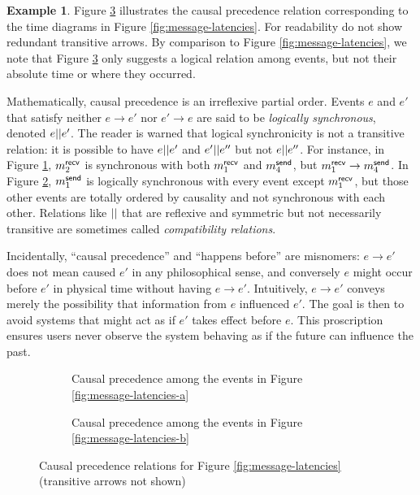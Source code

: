 \documentclass[]             %
{NASA}                       %
\theoremstyle{definition}
\newtheorem{example}{Example}[section]
\begin{document}
\begin{example}
  Figure \ref{fig:causal-precedence} illustrates the causal precedence
  relation corresponding to the time diagrams in Figure
  \ref{fig:message-latencies}. For readability do not show redundant
  transitive arrows. By comparison to Figure
  \ref{fig:message-latencies}, we note that Figure
  \ref{fig:causal-precedence} only suggests a logical relation among
  events, but not their absolute time or where they occurred.
\end{example}

Mathematically, causal precedence is an irreflexive partial
order. Events $e$ and $e'$ that satisfy neither $e \to e'$ nor
$e' \to e$ are said to be \emph{logically synchronous}, denoted
$e || e'$. The reader is warned that logical synchronicity is not
a transitive relation: it is possible to have $e || e'$ and
$e' || e''$ but not $e || e''$. For instance, in Figure
\ref{fig:message-co-a}, $m_{2}^{\mathsf{recv}}$ is synchronous with both
$m_{1}^{\mathsf{recv}}$ and $m_{4}^{\mathsf{send}}$, but $m_{1}^{\mathsf{recv}} \to m_{4}^{\mathsf{send}}$. In Figure
\ref{fig:message-co-b}, $m_{1}^{\mathsf{send}}$ is logically synchronous with
every event except $m_{1}^{\mathsf{recv}}$, but those other events are totally
ordered by causality and not synchronous with each other. Relations
like $||$ that are reflexive and symmetric but not necessarily
transitive are sometimes called \emph{compatibility relations}.

Incidentally, ``causal precedence'' and ``happens before'' are
misnomers: $e \to e'$ does not mean caused $e'$ in any philosophical
sense, and conversely $e$ might occur before $e'$ in physical time
without having $e \to e'$. Intuitively, $e \to e'$ conveys merely the
possibility that information from $e$ influenced $e'$. The goal is
then to avoid systems that might act as if $e'$ takes effect before
$e$. This proscription ensures users never observe the system behaving
as if the future can influence the past.

\begin{figure}
  \begingroup
  \setlength\belowcaptionskip{4ex}
  \begin{subfigure}{1\textwidth}
    \centering
    
    \caption{Causal precedence among the events in Figure \ref{fig:message-latencies-a}}
    \label{fig:message-co-a}
  \end{subfigure}
  \endgroup
  \begin{subfigure}{1\textwidth}
    \centering
    
    \caption{Causal precedence among the events in Figure \ref{fig:message-latencies-b}}
    \label{fig:message-co-b}
  \end{subfigure}
  \caption{Causal precedence relations for Figure \ref{fig:message-latencies} (transitive arrows not shown)}
  \label{fig:causal-precedence}
\end{figure}
\end{document}
